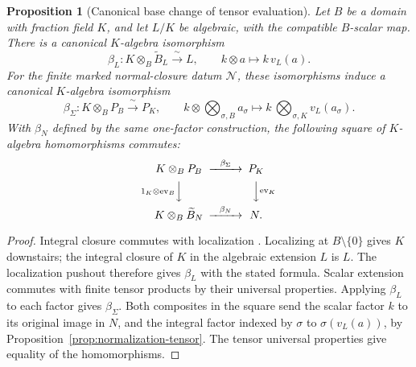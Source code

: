 \documentclass[11pt]{article}
\newtheorem{proposition}[theorem]{Proposition}
\theoremstyle{definition}
\theoremstyle{remark}
\begin{document}
\begin{proposition}[Canonical base change of tensor evaluation]
\label{prop:normalization-tensor-base-change}
Let \(B\) be a domain with fraction field \(K\), and let \(L/K\)
be algebraic, with the compatible \(B\)-scalar map. There is a canonical
\(K\)-algebra isomorphism
\[
  \beta_L:K\otimes_B\widetilde B_L\xrightarrow{\ \sim\ }L,
  \qquad k\otimes a\longmapsto k\,v_L(a).
\]
For the finite marked normal-closure datum \(\mathcal N\), these
isomorphisms induce a canonical \(K\)-algebra isomorphism
\[
  \beta_\Sigma:K\otimes_B P_B\xrightarrow{\ \sim\ }P_K,
  \qquad k\otimes\bigotimes_{\sigma,B}a_\sigma
    \longmapsto k\,\bigotimes_{\sigma,K}v_L(a_\sigma).
\]
With \(\beta_N\) defined by the same one-factor construction, the
following square of \(K\)-algebra homomorphisms commutes:
\[
\begin{CD}
  K\otimes_B P_B @>{\beta_\Sigma}>> P_K\\
  @V{1_K\otimes\operatorname{ev}_B}VV @VV{\operatorname{ev}_K}V\\
  K\otimes_B\widetilde B_N @>{\beta_N}>> N.
\end{CD}
\]
\end{proposition}

\begin{proof}
Integral closure commutes with localization
\cite{StacksIntegralClosureLocalization}. Localizing at
\(B\setminus\{0\}\) gives \(K\) downstairs; the integral closure
of \(K\) in the algebraic extension \(L\) is \(L\). The localization
pushout therefore gives \(\beta_L\) with the stated formula.
Scalar extension commutes with finite tensor products by their universal
properties. Applying \(\beta_L\) to each factor gives \(\beta_\Sigma\).
Both composites in the square send the scalar factor \(k\) to its
original image in \(N\), and the integral factor indexed by \(\sigma\)
to \(\sigma(v_L(a))\), by
Proposition~\ref{prop:normalization-tensor}. The tensor universal
properties give equality of the homomorphisms.
\end{proof}
\end{document}
